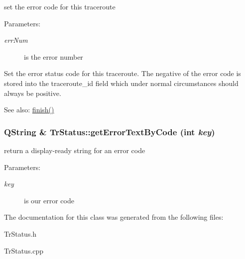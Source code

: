 set the error code for this traceroute \begin{Desc}
\item[Parameters:]
\begin{description}
\item[{\em errNum}]is the error number\end{description}
\end{Desc}
Set the error status code for this traceroute. The negative of the error code is stored into the traceroute\_\-id field which under normal circumstances should always be positive. \begin{Desc}
\item[See also:]\hyperlink{classTrStatus_cd81c57a0333bfd2733b48773174b890}{finish()} \end{Desc}
\hypertarget{classTrStatus_c5de091ddb15e288c413b9e846658fd8}{
\subsubsection[getErrorTextByCode]{\setlength{\rightskip}{0pt plus 5cm}QString \& TrStatus::getErrorTextByCode (int {\em key})}}
\label{classTrStatus_c5de091ddb15e288c413b9e846658fd8}


return a display-ready string for an error code \begin{Desc}
\item[Parameters:]
\begin{description}
\item[{\em key}]is our error code \end{description}
\end{Desc}


The documentation for this class was generated from the following files:\begin{CompactItemize}
\item 
TrStatus.h\item 
TrStatus.cpp\end{CompactItemize}
